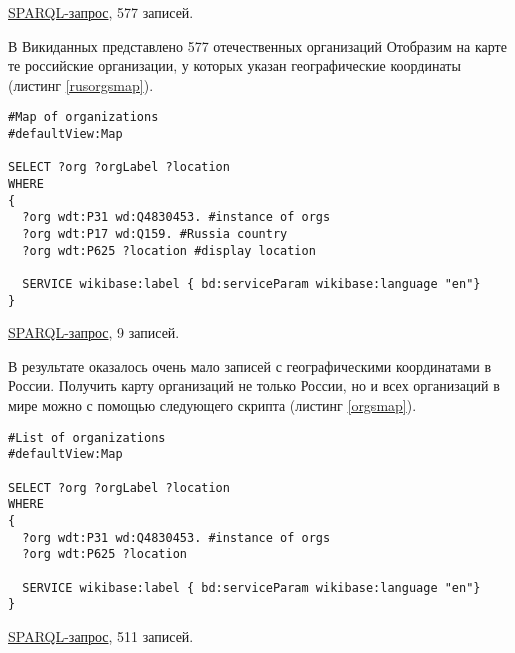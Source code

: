\href{https://query.wikidata.org/#%23List%20of%20organisations%20%0A%0ASELECT%20%3Forg%20%3ForgLabel%20%3Flocation%0AWHERE%0A%7B%0A%20%20%3Forg%20wdt%3AP31%20wd%3AQ4830453.%20%23instance%20of%20orgs%0A%20%20%3Forg%20wdt%3AP17%20wd%3AQ159.%20%23Russia%20country%0A%0A%20%20SERVICE%20wikibase%3Alabel%20%7B%20bd%3AserviceParam%20wikibase%3Alanguage%20%22en%22%7D%0A%7D}{SPARQL-запрос}, 577 записей.

В Викиданных представлено 577 отечественных организаций Отобразим на карте те российские организации, у которых указан географические координаты (листинг \ref{rusorgsmap}).

\begin{lstlisting}[language=SPARQL,label=rusorgsmap,caption=Карта организаций России]
#Map of organizations 
#defaultView:Map

SELECT ?org ?orgLabel ?location
WHERE
{
  ?org wdt:P31 wd:Q4830453. #instance of orgs
  ?org wdt:P17 wd:Q159. #Russia country
  ?org wdt:P625 ?location #display location

  SERVICE wikibase:label { bd:serviceParam wikibase:language "en"}
}
\end{lstlisting}

\href{https://query.wikidata.org/#%23List%20of%20organisations%20%0A%23defaultView%3AMap%0A%0ASELECT%20%3Forg%20%3ForgLabel%20%3Flocation%0AWHERE%0A%7B%0A%20%20%3Forg%20wdt%3AP31%20wd%3AQ4830453.%20%23instance%20of%20orgs%0A%20%20%3Forg%20wdt%3AP17%20wd%3AQ159.%20%23Russia%20country%0A%20%20%3Forg%20wdt%3AP625%20%3Flocation%0A%0A%20%20SERVICE%20wikibase%3Alabel%20%7B%20bd%3AserviceParam%20wikibase%3Alanguage%20%22en%22%7D%0A%7D}{SPARQL-запрос}, 9 записей.

В результате оказалось очень мало записей с географическими координатами в России. Получить карту организаций не только России, но и всех организаций в мире можно с помощью следующего скрипта (листинг \ref{orgsmap}).

\begin{lstlisting}[language=SPARQL,label=orgsmap,caption=Карта организаций мира]
#List of organizations 
#defaultView:Map

SELECT ?org ?orgLabel ?location
WHERE
{
  ?org wdt:P31 wd:Q4830453. #instance of orgs
  ?org wdt:P625 ?location

  SERVICE wikibase:label { bd:serviceParam wikibase:language "en"}
}
\end{lstlisting}

\href{https://query.wikidata.org/#%23List%20of%20organisations%20%0A%23defaultView%3AMap%0A%0ASELECT%20%3Forg%20%3ForgLabel%20%3Flocation%0AWHERE%0A%7B%0A%20%20%3Forg%20wdt%3AP31%20wd%3AQ4830453.%20%23instance%20of%20orgs%0A%20%20%3Forg%20wdt%3AP625%20%3Flocation%0A%0A%20%20SERVICE%20wikibase%3Alabel%20%7B%20bd%3AserviceParam%20wikibase%3Alanguage%20%22en%22%7D%0A%7D}{SPARQL-запрос}, 511 записей.


